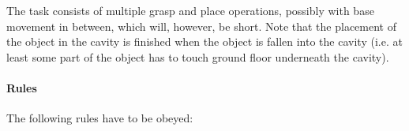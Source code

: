 The task consists of multiple grasp and place operations, possibly with base movement in between, which will, however, be short.  Note that the placement of the object in the cavity is finished when the object is fallen into the cavity (i.e. at least some part of the object has to touch ground floor underneath the cavity).
\par
{}
\par

%
%
%

\paragraph{Rules}
The following rules have to be obeyed:

